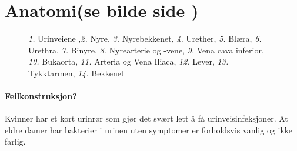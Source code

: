 		\section{Anatomi(se bilde side \pageref{bildeurinvei})}
					\begin{figure}[ht]
                      \centering
                      	\label{bildeurinvei}%
                      \caption{\emph{1.} Urinveiene ,\emph{2.} Nyre, \emph{3.} Nyrebekkenet, \emph{4.} Urether, \emph{5.} Blæra, \emph{6.} Urethra, \emph{7.} Binyre, \emph{8.} Nyrearterie og -vene, \emph{9.} Vena cava inferior, \emph{10.} Bukaorta, \emph{11.} Arteria og Vena Iliaca, \emph{12.} Lever, \emph{13.} Tykktarmen, \emph{14.} Bekkenet}
                    \end{figure}
			\paragraph{Feilkonstruksjon?\\}
				Kvinner har et kort urinrør som gjør det svært lett å få urinveisinfeksjoner. At eldre damer har bakterier i urinen uten symptomer er forholdsvis vanlig og ikke farlig\cite{uti-old}.
